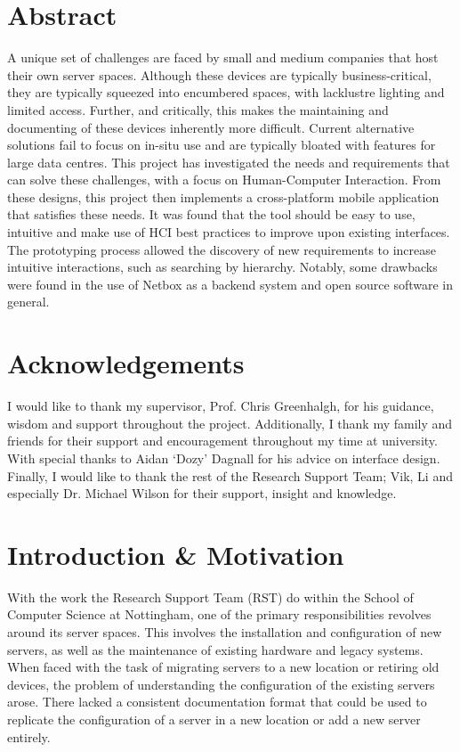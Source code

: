 \documentclass [11pt,a4paper]{article}
\begin{document}
\section*{Abstract}
    \noindent
    A unique set of challenges are faced by small and medium companies that host their own server spaces. Although these devices are typically business-critical, they are typically squeezed into encumbered spaces, with lacklustre lighting and limited access. Further, and critically, this makes the maintaining and documenting of these devices inherently more difficult. Current alternative solutions fail to focus on in-situ use and are typically bloated with features for large data centres. This project has investigated the needs and requirements that can solve these challenges, with a focus on Human-Computer Interaction. From these designs, this project then implements a cross-platform mobile application that satisfies these needs. It was found that the tool should be easy to use, intuitive and make use of HCI best practices to improve upon existing interfaces. The prototyping process allowed the discovery of new requirements to increase intuitive interactions, such as searching by hierarchy. Notably, some drawbacks were found in the use of Netbox as a backend system and open source software in general.  

\section*{Acknowledgements}
    \noindent
    I would like to thank my supervisor, Prof. Chris Greenhalgh, for his guidance, wisdom and support throughout the project. Additionally, I thank my family and friends for their support and encouragement throughout my time at university. With special thanks to Aidan `Dozy' Dagnall for his advice on interface design.
    Finally, I would like to thank the rest of the Research Support Team; Vik, Li and especially Dr. Michael Wilson for their support, insight and knowledge.

\pagebreak

\tableofcontents
\pagebreak 
{}    

\setlength{\parskip}{2ex}

\section{Introduction \& Motivation}
\label{sec:introduction}
With the work the Research Support Team (RST) do within the School of Computer Science at Nottingham, one of the primary responsibilities revolves around its server spaces. This involves the installation and configuration of new servers, as well as the maintenance of existing hardware and legacy systems. When faced with the task of migrating servers to a new location or retiring old devices, the problem of understanding the configuration of the existing servers arose. There lacked a consistent documentation format that could be used to replicate the configuration of a server in a new location or add a new server entirely.
\end{document}
